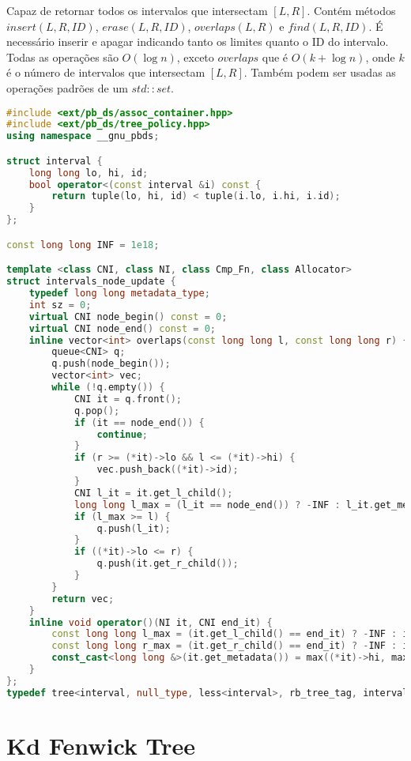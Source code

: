 \documentclass[11pt, a4paper, oneside]{book}
\begin{document}
Capaz de retornar todos os intervalos que intersectam $[L, R]$. Contém métodos $insert({L, R, ID})$, $erase({L, R, ID})$, $overlaps(L, R)$ e $find({L, R, ID})$. É necessário inserir e apagar indicando tanto os limites quanto o ID do intervalo. Todas as operações são $O(\log n)$, exceto $overlaps$ que é $O(k + \log n)$, onde $k$ é o número de intervalos que intersectam $[L, R]$. Também podem ser usadas as operações padrões de um $std::set$.

\hfill

\begin{lstlisting}[language=C++]
#include <ext/pb_ds/assoc_container.hpp>
#include <ext/pb_ds/tree_policy.hpp>
using namespace __gnu_pbds;

struct interval {
    long long lo, hi, id;
    bool operator<(const interval &i) const {
        return tuple(lo, hi, id) < tuple(i.lo, i.hi, i.id);
    }
};

const long long INF = 1e18;

template <class CNI, class NI, class Cmp_Fn, class Allocator>
struct intervals_node_update {
    typedef long long metadata_type;
    int sz = 0;
    virtual CNI node_begin() const = 0;
    virtual CNI node_end() const = 0;
    inline vector<int> overlaps(const long long l, const long long r) {
        queue<CNI> q;
        q.push(node_begin());
        vector<int> vec;
        while (!q.empty()) {
            CNI it = q.front();
            q.pop();
            if (it == node_end()) {
                continue;
            }
            if (r >= (*it)->lo && l <= (*it)->hi) {
                vec.push_back((*it)->id);
            }
            CNI l_it = it.get_l_child();
            long long l_max = (l_it == node_end()) ? -INF : l_it.get_metadata();
            if (l_max >= l) {
                q.push(l_it);
            }
            if ((*it)->lo <= r) {
                q.push(it.get_r_child());
            }
        }
        return vec;
    }
    inline void operator()(NI it, CNI end_it) {
        const long long l_max = (it.get_l_child() == end_it) ? -INF : it.get_l_child().get_metadata();
        const long long r_max = (it.get_r_child() == end_it) ? -INF : it.get_r_child().get_metadata();
        const_cast<long long &>(it.get_metadata()) = max((*it)->hi, max(l_max, r_max));
    }
};
typedef tree<interval, null_type, less<interval>, rb_tree_tag, intervals_node_update> interval_tree;
\end{lstlisting}
\hfill

\section{Kd Fenwick Tree}
\end{document}
